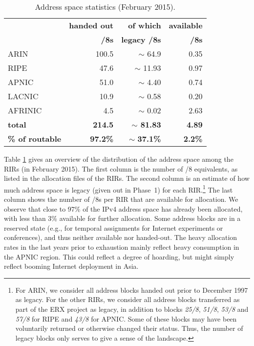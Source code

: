 \documentclass[letter]{sigcomm-alternate}
\begin{document}
\begin{table}
\small
\begin{center}
\begin{tabular}{|l||r|r||r|}
\hline
  & \textbf{handed out} & \textbf{of which} & \textbf{available} \\ 
  & \textbf{/8s} & \textbf{legacy /8s} & \textbf{/8s} \\ 

\hline 
\hline 
ARIN & 100.5 & $\sim$ 64.9 & 0.35 \\ 
\hline 
RIPE & 47.6 & $\sim$ 11.93 & 0.97 \\ 
\hline 
APNIC & 51.0 & $\sim$ 4.40 & 0.74 \\ 
\hline 
LACNIC & 10.9 & $\sim$ 0.58 & 0.20 \\ 
\hline 
AFRINIC & 4.5 & $\sim$ 0.02 & 2.63 \\ 
\hline 
\hline
\textbf{total} & \textbf{214.5} & \textbf{$\sim$ 81.83} & \textbf{4.89} \\ 
\textbf{\textbf{\% of routable}} & \textbf{97.2\%} & $\sim$ \textbf{37.1\%} & 
\textbf{2.2\%} \\ 
\hline
\end{tabular} 
\end{center}
\caption{Address space statistics (February 2015).}
\label{tab:allocation_stats}
 \vspace{-1.5em}
\end{table}

Table \ref{tab:allocation_stats} gives an overview of the distribution of the
address space among the RIRs (in February 2015). The first column is the 
number of /8 equivalents, as listed in the allocation files of the RIRs.  The 
second column is an estimate of how much address space is legacy 
(given out in Phase~1) for each RIR.\footnote{
	For ARIN, we consider all address blocks handed out prior to
	December 1997 as legacy.  For the other RIRs, we consider all address
	blocks transferred as part of the ERX project as legacy, in addition to 
	blocks \textit{25/8}, \textit{51/8}, \textit{53/8} and \textit{57/8} for 
	RIPE and \textit{43/8} for APNIC. Some of these blocks may have been 
	voluntarily returned or otherwise changed their status.  Thus, 	the 
	number of legacy blocks only serves to give a sense of the landscape.
}
The last column shows the number of /8s per RIR that are available for
allocation. We observe that close to 97\% of the IPv4 address space has 
already been allocated, with less than 3\% available for further allocation.  
Some address blocks are in a reserved state (e.g., for temporal assignments for 
Internet experiments or conferences), and thus neither available nor 
handed-out. The heavy allocation rates in the last years prior to 
exhaustion mainly reflect heavy consumption in the APNIC region.  This could 
reflect a degree of hoarding, but might simply reflect booming Internet 
deployment in Asia.
\end{document}
